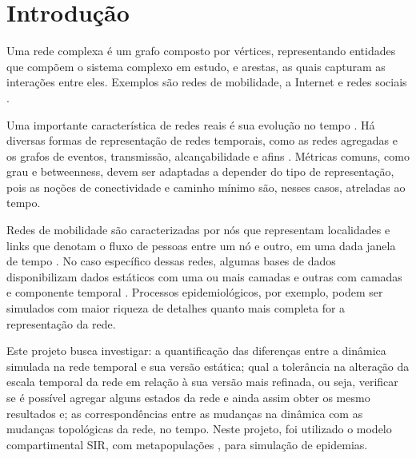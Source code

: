 \chapter[Introdução]{Introdução}
Uma rede complexa é um grafo composto por vértices, representando entidades que compõem o sistema complexo em estudo, e arestas, as quais capturam as interações entre eles. Exemplos são redes de mobilidade, a Internet e redes sociais \cite{BOCCALETTI2006, barabasi2016network}.

Uma importante característica de redes reais é sua evolução no tempo \cite{Kim2012, Masuda2021}. Há diversas formas de representação de redes temporais, como as redes agregadas e os grafos de eventos, transmissão, alcançabilidade e afins \cite{Sano2021}. Métricas comuns, como grau e betweenness, devem ser adaptadas a depender do tipo de representação, pois as noções de conectividade e caminho mínimo são, nesses casos, atreladas ao tempo. 

Redes de mobilidade são caracterizadas por nós que representam localidades e links que denotam o fluxo de pessoas entre um nó e outro, em uma dada janela de tempo \cite{Lamosa2021}. No caso específico dessas redes, algumas bases de dados disponibilizam dados estáticos com uma ou mais camadas \cite{Cavararo2017, 50OD} e outras com camadas e componente temporal \cite{Gallotti_2015}. Processos epidemiológicos, por exemplo, podem ser simulados com
maior riqueza de detalhes quanto mais completa for a representação da rede. 

Este projeto busca investigar: a quantificação das diferenças entre a dinâmica simulada na rede temporal e sua versão estática; qual a tolerância na alteração da escala temporal da rede em relação à sua versão mais refinada, ou seja, verificar se é possível agregar alguns estados da rede e ainda assim obter os mesmo resultados e; as correspondências entre as mudanças na dinâmica com as mudanças topológicas da rede, no tempo. Neste projeto, foi utilizado o modelo compartimental SIR, com metapopulações \cite{Kermack1927, Harko2014}, para simulação de epidemias.

